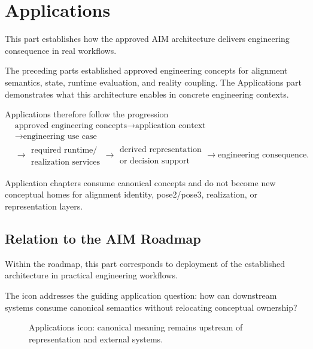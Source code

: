 
\chapter*{Applications}
{}

This part establishes how the approved AIM architecture delivers
engineering consequence in real workflows.

The preceding parts established approved engineering concepts for
alignment semantics, state, runtime evaluation, and reality coupling.
The Applications part demonstrates what this architecture enables in
concrete engineering contexts.

Applications therefore follow the progression
\[
\begin{aligned}
&\text{approved engineering concepts}
\rightarrow
\text{application context}
\\
&\rightarrow
\text{engineering use case}
\\
&\rightarrow
\substack{\text{required runtime/}\\\text{realization services}}
\rightarrow
\substack{\text{derived representation}\\\text{or decision support}}
\rightarrow
\text{engineering consequence}.
\end{aligned}
\]

Application chapters consume canonical concepts and do not become new
conceptual homes for alignment identity, pose2/pose3, realization, or
representation layers.

\section*{Relation to the AIM Roadmap}

Within the roadmap, this part corresponds to deployment of the
established architecture in practical engineering workflows.

The icon addresses the guiding application question: how can downstream
systems consume canonical semantics without relocating conceptual
ownership?

\begin{figure}[ht]
\centering

\caption{Applications icon: canonical meaning remains upstream of representation and external systems.}
\label{fig:icon-applications-downstream}
\end{figure}

